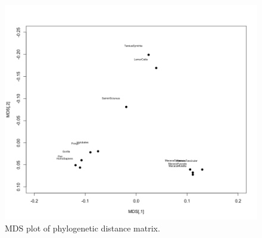\documentclass[12pt]{article}
\makeatletter
\theoremstyle{homework}
\newenvironment{exercise}[1]
{\def\@currentlabel{#1}\exercisecore}
{\endexercisecore}
\makeatother
\begin{document}
\begin{exercise}{2}
    \begin{figure}[H]
      \begin{center}
        \caption{MDS plot of phylogenetic distance matrix.}
      \includegraphics[width = \textwidth]{Rplot01.png}
      \end{center}
    \end{figure}



\end{exercise}
\end{document}
